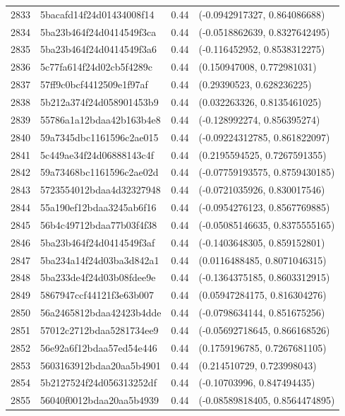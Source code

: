 \begin{table}[ht]
\begin{tabular}{rlrl}
  2833 & 5bacafd14f24d01434008f14 & 0.44 & (-0.0942917327, 0.864086688) \\ 
  2834 & 5ba23b464f24d0414549f3ca & 0.44 & (-0.0518862639, 0.8327642495) \\ 
  2835 & 5ba23b464f24d0414549f3a6 & 0.44 & (-0.116452952, 0.8538312275) \\ 
  2836 & 5c77fa614f24d02cb5f4289c & 0.44 & (0.150947008, 0.772981031) \\ 
  2837 & 57ff9c0bcf4412509e1f97af & 0.44 & (0.29390523, 0.628236225) \\ 
  2838 & 5b212a374f24d058901453b9 & 0.44 & (0.032263326, 0.8135461025) \\ 
  2839 & 55786a1a12bdaa42b163b4e8 & 0.44 & (-0.128992274, 0.856395274) \\ 
  2840 & 59a7345dbc1161596c2ae015 & 0.44 & (-0.09224312785, 0.861822097) \\ 
  2841 & 5c449ae34f24d06888143c4f & 0.44 & (0.2195594525, 0.7267591355) \\ 
  2842 & 59a73468bc1161596c2ae02d & 0.44 & (-0.07759193575, 0.8759430185) \\ 
  2843 & 5723554012bdaa4d32327948 & 0.44 & (-0.0721035926, 0.830017546) \\ 
  2844 & 55a190ef12bdaa3245ab6f16 & 0.44 & (-0.0954276123, 0.8567769885) \\ 
  2845 & 56b4c49712bdaa77b03f4f38 & 0.44 & (-0.05085146635, 0.8375555165) \\ 
  2846 & 5ba23b464f24d0414549f3af & 0.44 & (-0.1403648305, 0.859152801) \\ 
  2847 & 5ba234a14f24d03ba3d842a1 & 0.44 & (0.0116488485, 0.8071046315) \\ 
  2848 & 5ba233de4f24d03b08fdee9e & 0.44 & (-0.1364375185, 0.8603312915) \\ 
  2849 & 5867947ccf44121f3e63b007 & 0.44 & (0.05947284175, 0.816304276) \\ 
  2850 & 56a2465812bdaa42423b4dde & 0.44 & (-0.0798634144, 0.851675256) \\ 
  2851 & 57012c2712bdaa5281734ee9 & 0.44 & (-0.05692718645, 0.866168526) \\ 
  2852 & 56e92a6f12bdaa57ed54e446 & 0.44 & (0.1759196785, 0.7267681105) \\ 
  2853 & 5603163912bdaa20aa5b4901 & 0.44 & (0.214510729, 0.723998043) \\ 
  2854 & 5b2127524f24d056313252df & 0.44 & (-0.10703996, 0.847494435) \\ 
  2855 & 56040f0012bdaa20aa5b4939 & 0.44 & (-0.08589818405, 0.8564474895) \\ 

\end{tabular}
\end{table}
